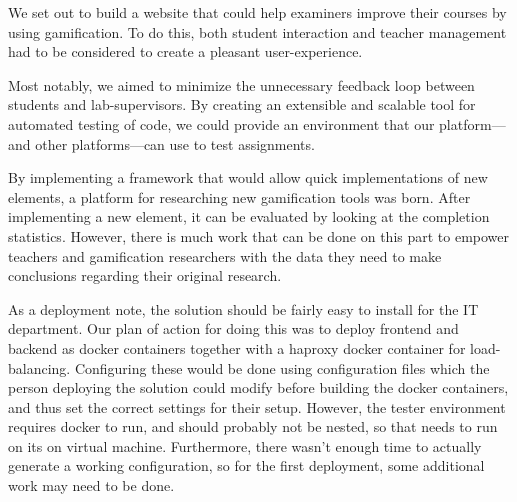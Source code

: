 We set out to build a website that could help examiners improve their courses by using gamification. To do this, both student interaction and teacher management had to be considered to create a pleasant user-experience.

Most notably, we aimed to minimize the unnecessary feedback loop between students and lab-supervisors. By creating an extensible and scalable tool for automated testing of code, we could provide an environment that our platform---and other platforms---can use to test assignments.

By implementing a framework that would allow quick implementations of new elements, a platform for researching new gamification tools was born. After implementing a new element, it can be evaluated by looking at the completion statistics. However, there is much work that can be done on this part to empower teachers and gamification researchers with the data they need to make conclusions regarding their original research.

As a deployment note, the solution should be fairly easy to install for the IT department. Our plan of action for doing this was to deploy frontend and backend as docker containers together with a haproxy docker container for load-balancing. Configuring these would be done using configuration files which the person deploying the solution could modify before building the docker containers, and thus set the correct settings for their setup. However, the tester environment requires docker to run, and should probably not be nested, so that needs to run on its on virtual machine. Furthermore, there wasn't enough time to actually generate a working configuration, so for the first deployment, some additional work may need to be done.
